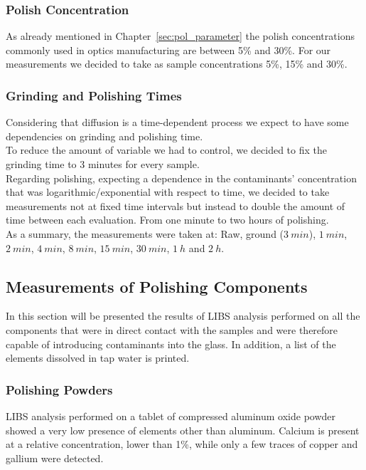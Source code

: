 \subsubsection{Polish Concentration}
\label{subsubsec:polish_concentration_setup}

As already mentioned in Chapter~\ref{sec:pol_parameter} the polish concentrations commonly used in optics manufacturing are between 5\% and 30\%. For our measurements we decided to take as sample concentrations 5\%, 15\% and 30\%. 

\subsubsection{Grinding and Polishing Times}
\label{subsubsec:grinding_pol_times}
Considering that diffusion is a time-dependent process we expect to have some dependencies on grinding and polishing time.
\\
To reduce the amount of variable we had to control, we decided to fix the grinding time to 3 minutes for every sample.
\\
Regarding polishing, expecting a dependence in the contaminants' concentration that was logarithmic/exponential with respect to time, we decided to take measurements not at fixed time intervals but instead to double the amount of time between each evaluation. From one minute to two hours of polishing.
\\
As a summary, the measurements were taken at: 
Raw, ground ($3\: min$), $1\: min$, $2\: min$, $4\: min$, $8\: min$, $15\: min$, $30\: min$, $1\: h$ and $2\: h$.

\subsection{Measurements of Polishing Components}
\label{subsec:measurements_pol_components}
In this section will be presented the results of LIBS analysis performed on all the components that were in direct contact with the samples and were therefore capable of introducing contaminants into the glass. In addition, a list of the elements dissolved in tap water is printed.

\subsubsection{Polishing Powders}
\label{subsubsec:meas_pol_powders}
LIBS analysis performed on a tablet of compressed aluminum oxide powder showed a very low presence of elements other than aluminum. Calcium is present at a relative concentration, lower than 1\%, while only a few traces of copper and gallium were detected.

